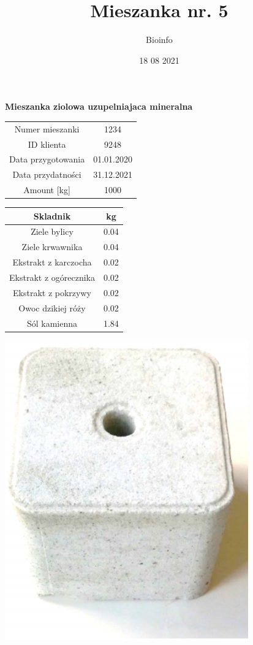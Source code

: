 \documentclass[]{article}
\title{Mieszanka nr. 5}
\author{Bioinfo}
\date{18 08 2021}
\begin{document}
\maketitle

\begin{center}

\textbf{Mieszanka ziolowa uzupelniajaca mineralna}

\end{center}

\begin{longtable}[]{@{}cc@{}}
\toprule
Numer mieszanki & 1234\tabularnewline
ID klienta & 9248\tabularnewline
Data przygotowania & 01.01.2020\tabularnewline
Data przydatności & 31.12.2021\tabularnewline
Amount {[}kg{]} & 1000\tabularnewline
\bottomrule
\end{longtable}

\begin{longtable}[]{@{}cc@{}}
\toprule
Skladnik & kg\tabularnewline
\midrule
\endhead
Ziele bylicy & 0.04\tabularnewline
Ziele krwawnika & 0.04\tabularnewline
Ekstrakt z karczocha & 0.02\tabularnewline
Ekstrakt z ogórecznika & 0.02\tabularnewline
Ekstrakt z pokrzywy & 0.02\tabularnewline
Owoc dzikiej róży & 0.02\tabularnewline
Sól kamienna & 1.84\tabularnewline
\bottomrule
\end{longtable}

\begin{center}\includegraphics[width=4.14in]{obraz_5} \end{center}
\end{document}
